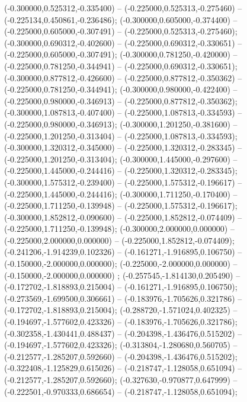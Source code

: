  (-0.300000,0.525312,-0.335400) -- (-0.225000,0.525313,-0.275460) -- (-0.225134,0.450861,-0.236486);
 (-0.300000,0.605000,-0.374400) -- (-0.225000,0.605000,-0.307491) -- (-0.225000,0.525313,-0.275460);
 (-0.300000,0.690312,-0.402600) -- (-0.225000,0.690312,-0.330651) -- (-0.225000,0.605000,-0.307491);
 (-0.300000,0.781250,-0.420000) -- (-0.225000,0.781250,-0.344941) -- (-0.225000,0.690312,-0.330651);
 (-0.300000,0.877812,-0.426600) -- (-0.225000,0.877812,-0.350362) -- (-0.225000,0.781250,-0.344941);
 (-0.300000,0.980000,-0.422400) -- (-0.225000,0.980000,-0.346913) -- (-0.225000,0.877812,-0.350362);
 (-0.300000,1.087813,-0.407400) -- (-0.225000,1.087813,-0.334593) -- (-0.225000,0.980000,-0.346913);
 (-0.300000,1.201250,-0.381600) -- (-0.225000,1.201250,-0.313404) -- (-0.225000,1.087813,-0.334593);
 (-0.300000,1.320312,-0.345000) -- (-0.225000,1.320312,-0.283345) -- (-0.225000,1.201250,-0.313404);
 (-0.300000,1.445000,-0.297600) -- (-0.225000,1.445000,-0.244416) -- (-0.225000,1.320312,-0.283345);
 (-0.300000,1.575312,-0.239400) -- (-0.225000,1.575312,-0.196617) -- (-0.225000,1.445000,-0.244416);
 (-0.300000,1.711250,-0.170400) -- (-0.225000,1.711250,-0.139948) -- (-0.225000,1.575312,-0.196617);
 (-0.300000,1.852812,-0.090600) -- (-0.225000,1.852812,-0.074409) -- (-0.225000,1.711250,-0.139948);
 (-0.300000,2.000000,0.000000) -- (-0.225000,2.000000,0.000000) -- (-0.225000,1.852812,-0.074409);
 (-0.241206,-1.914239,0.102326) -- (-0.161271,-1.916895,0.106750) -- (-0.150000,-2.000000,0.000000);
 (-0.225000,-2.000000,0.000000) -- (-0.150000,-2.000000,0.000000) ;
 (-0.257545,-1.814130,0.205490) -- (-0.172702,-1.818893,0.215004) -- (-0.161271,-1.916895,0.106750);
 (-0.273569,-1.699500,0.306661) -- (-0.183976,-1.705626,0.321786) -- (-0.172702,-1.818893,0.215004);
 (-0.288720,-1.571024,0.402325) -- (-0.194697,-1.577602,0.423326) -- (-0.183976,-1.705626,0.321786);
 (-0.302358,-1.430441,0.488437) -- (-0.204398,-1.436476,0.515202) -- (-0.194697,-1.577602,0.423326);
 (-0.313804,-1.280680,0.560705) -- (-0.212577,-1.285207,0.592660) -- (-0.204398,-1.436476,0.515202);
 (-0.322408,-1.125829,0.615026) -- (-0.218747,-1.128058,0.651094) -- (-0.212577,-1.285207,0.592660);
 (-0.327630,-0.970877,0.647999) -- (-0.222501,-0.970333,0.686654) -- (-0.218747,-1.128058,0.651094);
